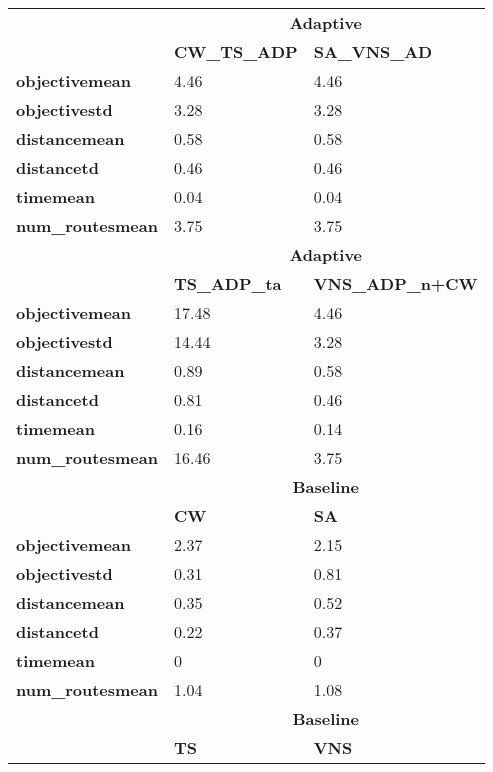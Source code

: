 \documentclass[12pt,a4paper,twoside]{ctexbook}
\begin{document}
\begin{table}[ht]
\centering
\begin{tabular}{|l|l|l|}
\hline
\multicolumn{1}{|c|}{\multirow{2}{*}{}} & \multicolumn{2}{c|}{\textbf{Adaptive}} \\ \cline{2-3}
\multicolumn{1}{|c|}{} & \textbf{CW\_TS\_ADP} & \textbf{SA\_VNS\_AD} \\ \hline
\textbf{objectivemean} & 4.46 & 4.46 \\ \hline
\textbf{objectivestd} & 3.28 & 3.28 \\ \hline
\textbf{distancemean} & 0.58 & 0.58 \\ \hline
\textbf{distancetd} & 0.46 & 0.46 \\ \hline
\textbf{timemean} & 0.04 & 0.04 \\ \hline
\textbf{num\_routesmean} & 3.75 & 3.75 \\ \hline
\multicolumn{1}{|c|}{\multirow{2}{*}{}} & \multicolumn{2}{c|}{\textbf{Adaptive}} \\ \cline{2-3}
\multicolumn{1}{|c|}{} & \textbf{TS\_ADP\_ta} & \textbf{VNS\_ADP\_n+CW} \\ \hline
\textbf{objectivemean} & 17.48 & 4.46 \\ \hline
\textbf{objectivestd} & 14.44 & 3.28 \\ \hline
\textbf{distancemean} & 0.89 & 0.58 \\ \hline
\textbf{distancetd} & 0.81 & 0.46 \\ \hline
\textbf{timemean} & 0.16 & 0.14 \\ \hline
\textbf{num\_routesmean} & 16.46 & 3.75 \\ \hline
\multicolumn{1}{|c|}{\multirow{2}{*}{}} & \multicolumn{2}{c|}{\textbf{Baseline}} \\ \cline{2-3}
\multicolumn{1}{|c|}{} & \textbf{CW} & \textbf{SA} \\ \hline
\textbf{objectivemean} & 2.37 & 2.15 \\ \hline
\textbf{objectivestd} & 0.31 & 0.81 \\ \hline
\textbf{distancemean} & 0.35 & 0.52 \\ \hline
\textbf{distancetd} & 0.22 & 0.37 \\ \hline
\textbf{timemean} & 0 & 0 \\ \hline
\textbf{num\_routesmean} & 1.04 & 1.08 \\ \hline
\multicolumn{1}{|c|}{\multirow{2}{*}{}} & \multicolumn{2}{c|}{\textbf{Baseline}} \\ \cline{2-3}
\multicolumn{1}{|c|}{} & \textbf{TS} & \textbf{VNS} \\ \hline

\end{tabular}
\end{table}
\end{document}
